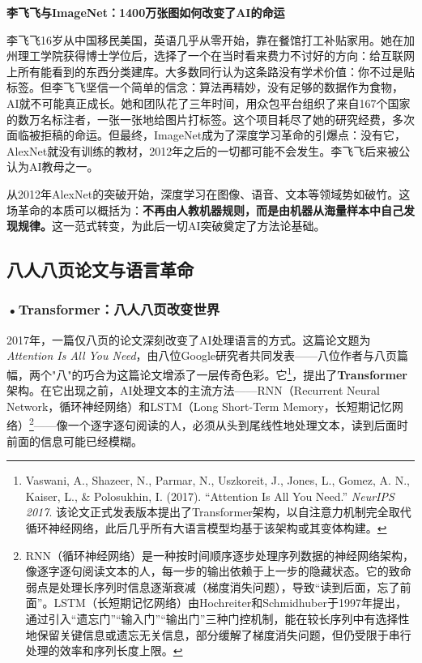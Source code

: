 \begin{funbox}
\small\textbf{李飞飞与ImageNet：1400万张图如何改变了AI的命运}

李飞飞16岁从中国移民美国，英语几乎从零开始，靠在餐馆打工补贴家用。她在加州理工学院获得博士学位后，选择了一个在当时看来费力不讨好的方向：给互联网上所有能看到的东西分类建库。大多数同行认为这条路没有学术价值：你不过是贴标签。但李飞飞坚信一个简单的信念：算法再精妙，没有足够的数据作为食物，AI就不可能真正成长。她和团队花了三年时间，用众包平台组织了来自167个国家的数万名标注者，一张一张地给图片打标签。这个项目耗尽了她的研究经费，多次面临被拒稿的命运。但最终，ImageNet成为了深度学习革命的引爆点：没有它，AlexNet就没有训练的教材，2012年之后的一切都可能不会发生。李飞飞后来被公认为AI教母之一。
\end{funbox}

从2012年AlexNet的突破开始，深度学习在图像、语音、文本等领域势如破竹。这场革命的本质可以概括为：\textbf{不再由人教机器规则，而是由机器从海量样本中自己发现规律。}这一范式转变，为此后一切AI突破奠定了方法论基础。

\subsection{八人八页论文与语言革命}

\subsubsection*{\textbf{•Transformer：八人八页改变世界}}

2017年，一篇仅八页的论文深刻改变了AI处理语言的方式。这篇论文题为\emph{Attention Is All You Need}，由八位Google研究者共同发表——八位作者与八页篇幅，两个"八"的巧合为这篇论文增添了一层传奇色彩。它\footnote{Vaswani, A., Shazeer, N., Parmar, N., Uszkoreit, J., Jones, L., Gomez, A. N., Kaiser, L., \& Polosukhin, I. (2017). ``Attention Is All You Need.'' \emph{NeurIPS 2017}. 该论文正式发表版本提出了Transformer架构，以自注意力机制完全取代循环神经网络，此后几乎所有大语言模型均基于该架构或其变体构建。}，提出了\textbf{Transformer}架构。在它出现之前，AI处理文本的主流方法——RNN（Recurrent Neural Network，循环神经网络）和LSTM（Long Short-Term Memory，长短期记忆网络）\footnote{RNN（循环神经网络）是一种按时间顺序逐步处理序列数据的神经网络架构，像逐字逐句阅读文本的人，每一步的输出依赖于上一步的隐藏状态。它的致命弱点是处理长序列时信息逐渐衰减（梯度消失问题），导致``读到后面，忘了前面''。LSTM（长短期记忆网络）由Hochreiter和Schmidhuber于1997年提出，通过引入``遗忘门''``输入门''``输出门''三种门控机制，能在较长序列中有选择性地保留关键信息或遗忘无关信息，部分缓解了梯度消失问题，但仍受限于串行处理的效率和序列长度上限。}——像一个逐字逐句阅读的人，必须从头到尾线性地处理文本，读到后面时前面的信息可能已经模糊。

